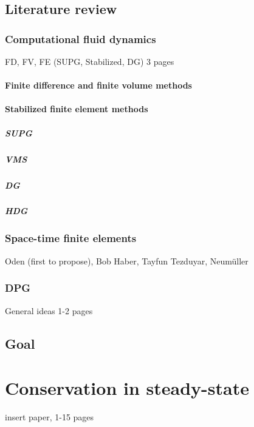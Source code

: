\documentclass[12pt]{report}
\begin{document}
\section{Literature review}

\subsection{Computational fluid dynamics}
FD, FV, FE (SUPG, Stabilized, DG) 3 pages

\subsubsection{Finite difference and finite volume methods}

\subsubsection{Stabilized finite element methods}
\paragraph{SUPG}
\paragraph{VMS}
\paragraph{DG}
\paragraph{HDG}

\subsection{Space-time finite elements}
Oden (first to propose), Bob Haber, Tayfun Tezduyar, Neum\"{u}ller

\subsection{DPG}
General ideas 1-2 pages


\section{Goal}



\chapter{Conservation in steady-state}
insert paper, 1-15 pages
\end{document}
